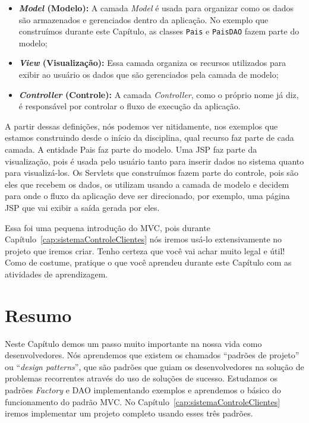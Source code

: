 \begin{itemize}

    \item \textbf{\textit{Model} (Modelo):} A camada \textit{Model} é usada para organizar como os dados são armazenados e gerenciados dentro da aplicação. No exemplo que construímos durante este Capítulo, as classes \texttt{Pais} e \texttt{PaisDAO} fazem parte do modelo;
    
    \item \textbf{\textit{View} (Visualização):} Essa camada organiza os recursos utilizados para exibir ao usuário os dados que são gerenciados pela camada de modelo;
    
    \item \textbf{\textit{Controller} (Controle):} A camada \textit{Controller}, como o próprio nome já diz, é responsável por controlar o fluxo de execução da aplicação.
    
\end{itemize}

A partir dessas definições, nós podemos ver nitidamente, nos exemplos que estamos construindo desde o início da disciplina, qual recurso faz parte de cada camada. A entidade Pais faz parte do modelo. Uma JSP faz parte da visualização, pois é usada pelo usuário tanto para inserir dados no sistema quanto para visualizá-los. Os Servlets que construímos fazem parte do controle, pois são eles que recebem os dados, os utilizam usando a camada de modelo e decidem para onde o fluxo da aplicação deve ser direcionado, por exemplo, uma página JSP que vai exibir a saída gerada por eles.

Essa foi uma pequena introdução do MVC, pois durante Capítulo~\ref{cap:sistemaControleClientes} nós iremos usá-lo extensivamente no projeto que iremos criar. Tenho certeza que você vai achar muito legal e útil! Como de costume, pratique o que você aprendeu durante este Capítulo com as atividades de aprendizagem.


\section{Resumo}

Neste Capítulo demos um passo muito importante na nossa vida como desenvolvedores. Nós aprendemos que existem os chamados ``padrões de projeto'' ou ``\textit{design patterns}'', que são padrões que guiam os desenvolvedores na solução de problemas recorrentes através do uso de soluções de sucesso. Estudamos os padrões \textit{Factory} e DAO implementando exemplos e aprendemos o básico do funcionamento do padrão MVC. No Capítulo~\ref{cap:sistemaControleClientes} iremos implementar um projeto completo usando esses três padrões. 


